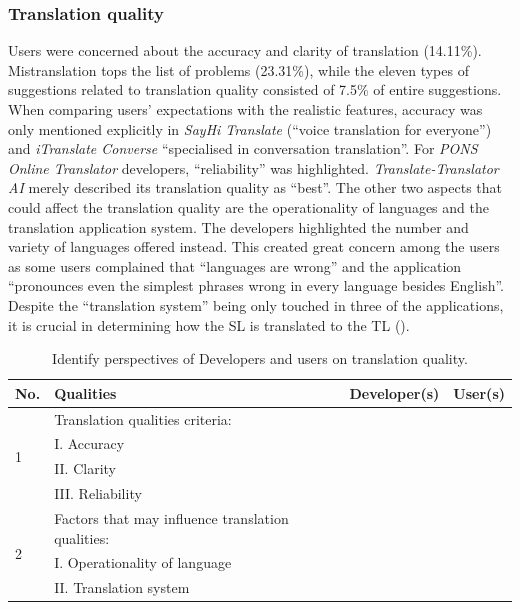 \documentclass[english]{textolivre}
\newcommand{\cmark}{\ding{51}}%
\newcommand{\xmark}{\ding{55}}%
\begin{document}
\subsubsection{Translation quality}\label{sec-contributors-expl}
Users were concerned about the accuracy and clarity of translation (14.11\%). Mistranslation tops the list of problems (23.31\%), while the eleven types of suggestions related to translation quality consisted of 7.5\% of entire suggestions. When comparing users’ expectations with the realistic features, accuracy was only mentioned explicitly in \textit{SayHi Translate} (“voice translation for everyone”) and \textit{iTranslate Converse} “specialised in conversation translation”.  For \textit{PONS Online Translator} developers, “reliability” was highlighted. \textit{Translate-Translator AI} merely described its translation quality as “best”. The other two aspects that could affect the translation quality are the operationality of languages and the translation application system. The developers highlighted the number and variety of languages offered instead. This created great concern among the users as some users complained that “languages are wrong” and the application “pronounces even the simplest phrases wrong in every language besides English”. Despite the “translation system” being only touched in three of the applications, it is crucial in determining how the SL is translated to the TL ().

\begin{table}[h!]
\centering
\begin{threeparttable}
\caption{Identify perspectives of Developers and users on translation quality.}
\label{tbl5}
\footnotesize
\begin{tabular}{p{1cm} p{5cm} p{2cm} p{2cm}}
\toprule
No. & Qualities & Developer(s) & User(s) \\ 
\midrule
\multirow{4}{=}{1} & Translation qualities criteria: & & \\
& I. Accuracy & \cmark & \cmark \\
& II. Clarity & \xmark & \cmark \\
& III. Reliability & \cmark & \xmark \\
\midrule
\multirow{3}{=}{2} & Factors that may influence translation qualities: & & \\
& I. Operationality of language & \xmark & \cmark \\
& II. Translation system & \cmark & \xmark \\
\bottomrule
\end{tabular}
\end{threeparttable}
\end{table}
\end{document}
